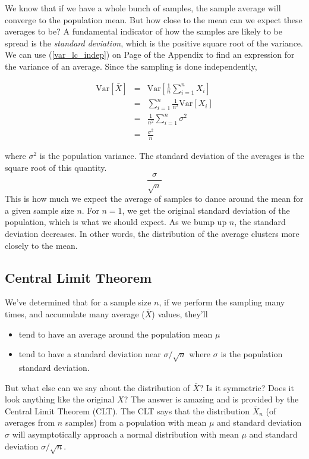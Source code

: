 \documentclass[]{article}
\begin{document}
We know that if we have a whole bunch of samples, the
sample average will converge to the population mean.
But how close to the mean can we expect these averages
to be?  A fundamental indicator of how the samples are
likely to be spread is the \emph{standard deviation},
which is the positive square root of the variance.
We can use (\ref{var_lc_indep}) on Page 
\pageref{var_lc_indep} of the Appendix
to find an expression for the variance of an average.
Since the sampling is done independently,

\begin{eqnarray}
\mbox{Var}[\bar{X}] &= &\mbox{Var}\left[ \frac{1}{n} 
         \sum_{i=1}^n X_i \right] \nonumber \\
  &= &\sum_{i=1}^n  \frac{1}{n^2} \mbox{Var}[X_i] \nonumber \\
  &= &\frac{1}{n^2} \sum_{i=1}^n  \sigma^2 \nonumber \\
  &= &\frac{\sigma^2}{n} \label{sample_var1}
\end{eqnarray}

where $\sigma^2$ is the population variance.
The standard deviation of the averages is the square root of
this quantity.
$$
\frac{\sigma}{\sqrt{n}}
$$
This is how much
we expect the average of samples to dance around the mean for
a given sample size $n$.  For $n=1$, we get the original standard
deviation of the population, which is what we should expect.  As
we bump up $n$, the standard deviation decreases.  In other words,
the distribution of the average clusters more closely to the mean.

\subsection{Central Limit Theorem} \label{sec:clt}

We've determined that for a sample size $n$, if we perform
the sampling many times, and accumulate many average
($\bar{X}$) values, they'll

\begin{itemize}
\item tend to have an average around the population mean $\mu$
\item tend to have a standard deviation near $\sigma/\sqrt{n}$
   where $\sigma$ is the population standard deviation.
\end{itemize}

But what else can we say about the distribution of $\bar{X}$?
Is it symmetric?  Does it look anything like the original $X$?
The answer is amazing and is provided by the Central Limit
Theorem (CLT).  The CLT says that the distribution $\bar{X}_n$
(of averages from $n$ samples) from a  
population with mean $\mu$ and standard deviation $\sigma$ will
asymptotically approach a normal distribution with mean $\mu$
and standard deviation $\sigma/\sqrt{n}$.
\end{document}
